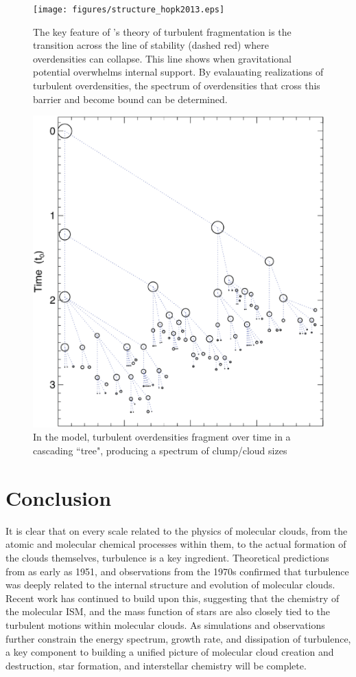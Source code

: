 \documentclass[12pt, preprint]{aastex}
\begin{document}
\begin{figure}[H] 
	\centering
	\texttt{[image: figures/structure\_hopk2013.eps]}
	\caption{The key feature of \citet{hopk2013}'s theory of turbulent
		fragmentation is the transition across the line of stability (dashed
		red) where overdensities can collapse.  This line shows when
		gravitational potential overwhelms internal support.  By evalauating realizations of turbulent
		overdensities, the spectrum of overdensities that cross this barrier and
	become bound can be determined.}
\end{figure}

\begin{figure}[H] 
	\centering
	\includegraphics[scale=0.3]{figures/fragtree_hopk2013.eps}
	\caption{In the \citet{hopk2013} model, turbulent overdensities fragment
	over time in a cascading ``tree", producing a spectrum of clump/cloud sizes}
\end{figure}

\section{Conclusion}
It is clear that on every scale related to the physics of molecular clouds, from
the atomic and molecular chemical processes within them, to the actual formation
of the clouds themselves, turbulence is a key ingredient.  Theoretical
predictions from as early as 1951, and observations from the 1970s confirmed
that turbulence was deeply related to the internal structure and evolution of
molecular clouds.  Recent work has continued to build upon this, suggesting that
the chemistry of the molecular ISM, and the mass function of stars are also 
closely tied to the turbulent motions within molecular clouds.  As simulations
and observations further constrain the energy spectrum, growth rate, and
dissipation of turbulence, a key component to building a unified picture 
of molecular cloud creation and destruction, star formation, and interstellar 
chemistry will be complete.
\end{document}
